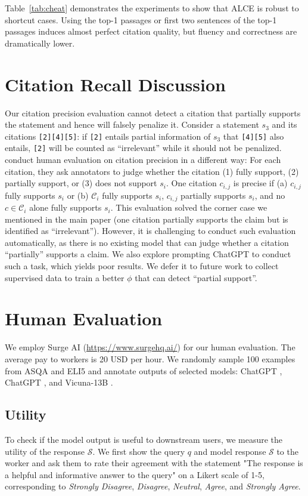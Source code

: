 \documentclass[11pt]{article}
\newcommand\ttt[1]{\texttt{#1}}
\newcommand{\vani}{{\sc{Vanilla}}}
\newcommand{\rerank}{{\sc{Rerank}}}
\newcommand{\citeeval}{ALCE}
\begin{document}


Table~\ref{tab:cheat} demonstrates the experiments to show that \citeeval{}
is robust to shortcut cases.
Using the top-1 passages or first two sentences of the top-1 passages
induces almost perfect citation quality, 
but fluency and correctness  are dramatically lower.

\section{Citation Recall Discussion}
\label{app_sec:citation_recall}

Our citation precision evaluation cannot detect a citation that partially supports the statement and hence will falsely penalize it. 
Consider a statement $s_3$ and its citations \ttt{[2][4][5]}:
if \ttt{[2]} entails partial information of $s_3$ that \ttt{[4][5]} also entails, 
\ttt{[2]} will be counted as ``irrelevant'' while it should not be penalized.
\citet{liu2023evaluating} conduct human evaluation on citation precision in a different way:
For each citation,
they ask annotators to judge whether the citation (1) fully support, (2) partially support, or (3) does not support $s_i$. 
One citation $c_{i,j}$ is precise if
(a) $c_{i,j}$ fully supports $s_i$ or 
(b) $\mathcal{C}_i$ fully supports $s_i$, $c_{i,j}$ partially supports $s_i$, and no $c\in \mathcal{C}_i$ alone fully supports $s_i$.
This evaluation solved the corner case we mentioned in the main paper (one citation partially supports the claim but is identified as ``irrelevant'').
However, it is challenging to conduct such evaluation automatically,
as there is no existing model that can judge whether a citation ``partially'' supports a claim.
We also explore prompting ChatGPT to conduct such a task, which yields poor results.
We defer it to future work to collect  supervised data to train a better $\phi$ that can detect ``partial support''.

\section{Human Evaluation}
\label{app_sec:human}

We employ Surge AI (\url{https://www.surgehq.ai/}) for our human evaluation.
The average pay to workers is 20 USD per hour.
We randomly sample 100 examples from ASQA and ELI5 and annotate outputs of selected models: ChatGPT \vani, ChatGPT \rerank, and Vicuna-13B \vani.


\subsection{Utility}
To check if the model output is useful to downstream users, we measure the utility of the response $\mathcal{S}$.
We first show the query $q$ and model response $\mathcal{S}$ to the worker and ask them to rate their agreement with  
the statement "The response is a helpful and informative answer to the query" on a Likert scale of 1-5, 
corresponding to \textit{Strongly Disagree}, \textit{Disagree}, \textit{Neutral}, \textit{Agree}, and \textit{Strongly Agree}.
\end{document}
